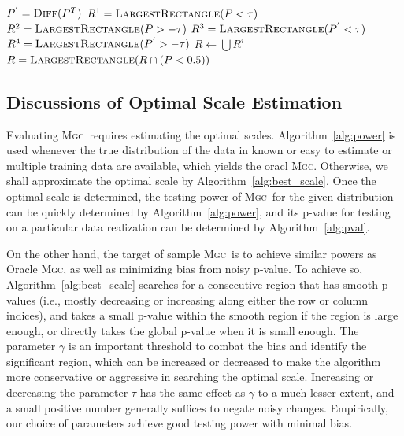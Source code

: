 \documentclass[11pt]{article}
\providecommand{\sct}[1]{{\normalfont\textsc{#1}}}
\newcommand{\Mgc}{\sct{Mgc}}
\newcommand{\rto}{\leftarrow}
\begin{document}
\begin{algorithm}
\begin{algorithmic}[1]
\State $P^{'} = \textsc{Diff}(P^{T})$ 
\State $R^{1} = \textsc{LargestRectangle}(P<\tau)$  
\State $R^{2} = \textsc{LargestRectangle}(P>-\tau)$  
\State $R^{3} = \textsc{LargestRectangle}(P^{'}<\tau)$ 
\State $R^{4} = \textsc{LargestRectangle}(P^{'}>-\tau)$
\State $R \rto \bigcup R^{i}$ 
\State $R = \textsc{LargestRectangle}(R \cap (P<0.5))$ 
\EndFunction
\end{algorithmic}
\end{algorithm}

\clearpage
\subsection{Discussions of Optimal Scale Estimation}
\label{appen:diss}
Evaluating \Mgc~requires estimating the optimal scales. Algorithm~\ref{alg:power} is used whenever the true distribution of the data in known or easy to estimate or multiple training data are available, which yields the oracl \Mgc. Otherwise, we shall approximate the optimal scale by Algorithm~\ref{alg:best_scale}. Once the optimal scale is determined, the testing power of \Mgc~for the given distribution can be quickly determined by Algorithm~\ref{alg:power}, and its p-value for testing on a particular data realization can be determined by Algorithm~\ref{alg:pval}.

On the other hand, the target of sample \Mgc~is to achieve similar powers as Oracle \Mgc, as well as minimizing bias from noisy p-value. To achieve so, Algorithm~\ref{alg:best_scale} searches for a consecutive region that has smooth p-values (i.e., mostly decreasing or increasing along either the row or column indices), and takes a small p-value within the smooth region if the region is large enough, or directly takes the global p-value when it is small enough. The parameter $\gamma$ is an important threshold to combat the bias and identify the significant region, which can be increased or decreased to make the algorithm more conservative or aggressive in searching the optimal scale. Increasing or decreasing the parameter $\tau$ has the same effect as $\gamma$ to a much lesser extent, and a small positive number generally suffices to negate noisy changes. Empirically, our choice of parameters achieve good testing power with minimal bias.
\end{document}

